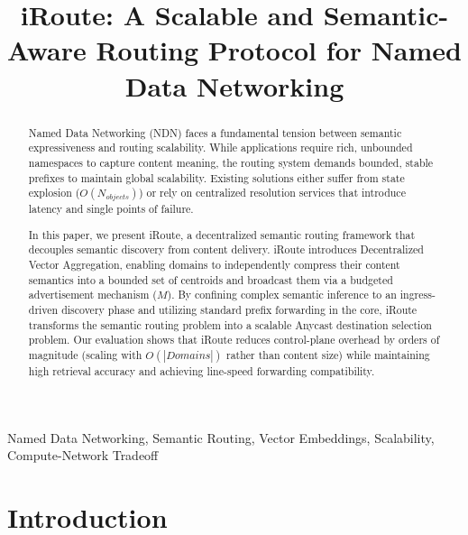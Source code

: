 \documentclass[conference]{IEEEtran}
\newcommand{\sysname}{iRoute}
\begin{document}
\title{iRoute: A Scalable and Semantic-Aware Routing Protocol for Named Data Networking}

\maketitle

\begin{abstract}
Named Data Networking (NDN) faces a fundamental tension between semantic expressiveness and routing scalability. While applications require rich, unbounded namespaces to capture content meaning, the routing system demands bounded, stable prefixes to maintain global scalability. Existing solutions either suffer from state explosion ($O(N_{objects})$) or rely on centralized resolution services that introduce latency and single points of failure. 

In this paper, we present \sysname{}, a decentralized semantic routing framework that decouples semantic discovery from content delivery. \sysname{} introduces Decentralized Vector Aggregation, enabling domains to independently compress their content semantics into a bounded set of centroids and broadcast them via a budgeted advertisement mechanism ($M$). By confining complex semantic inference to an ingress-driven discovery phase and utilizing standard prefix forwarding in the core, \sysname{} transforms the semantic routing problem into a scalable Anycast destination selection problem. Our evaluation shows that \sysname{} reduces control-plane overhead by orders of magnitude (scaling with $O(|Domains|)$ rather than content size) while maintaining high retrieval accuracy and achieving line-speed forwarding compatibility.
\end{abstract}

\begin{IEEEkeywords}
Named Data Networking, Semantic Routing, Vector Embeddings, Scalability, Compute-Network Tradeoff
\end{IEEEkeywords}

\section{Introduction}
\label{sec:intro}
\end{document}
